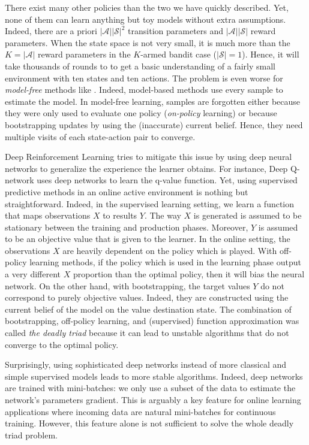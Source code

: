 {There exist many other policies than the two we have quickly described. Yet, none of them can learn anything but toy models without extra assumptions. Indeed, there are a priori $|\mathcal{A}||\mathcal{S}|^2$ transition parameters and $|\mathcal{A}||\mathcal{S}|$ reward parameters. When the state space is not very small, it is much more than the $K = |\mathcal{A}|$ reward parameters in the $K$-armed bandit case ($|\mathcal{S}| = 1$). Hence, it will take thousands of rounds to \UCRLtwo to get a basic understanding of a fairly small environment with ten states and ten actions. The problem is even worse for \emph{model-free} methods like \QLearning. Indeed, model-based methods use every sample to estimate the model. In model-free learning, samples are forgotten either because they were only used to evaluate one policy (\emph{on-policy} learning) or because bootstrapping updates by using the (inaccurate) current belief. Hence, they need multiple visits of each state-action pair to converge. 

Deep Reinforcement Learning tries to mitigate this issue by using deep neural networks to generalize the experience the learner obtains. For instance, Deep Q-network \citep{mnih2013playing} uses deep networks to learn the q-value function. Yet, using supervised predictive methods in an online active environment is nothing but straightforward. Indeed, in the supervised learning setting, we learn a function that maps observations $X$ to results $Y$. The way $X$ is generated is assumed to be stationary between the training and production phases. Moreover, $Y$ is assumed to be an objective value that is given to the learner. In the online setting, the observations $X$ are heavily dependent on the policy which is played. With off-policy learning methods, if the policy which is used in the learning phase output a very different $X$ proportion than the optimal policy, then it will bias the neural network. On the other hand, with bootstrapping, the target values $Y$ do not correspond to purely objective values. Indeed, they are constructed using the current belief of the model on the value destination state. The combination of bootstrapping, off-policy learning, and (supervised) function approximation was called \emph{the deadly triad} because it can lead to unstable algorithms that do not converge to the optimal policy.

Surprisingly, using sophisticated deep networks instead of more classical and simple supervised models leads to more stable algorithms. Indeed, deep networks are trained with mini-batches: we only use a subset of the data to estimate the network's parameters gradient. This is arguably a key feature for online learning applications where incoming data are natural mini-batches for continuous training. However, this feature alone is not sufficient to solve the whole deadly triad problem. 

}
